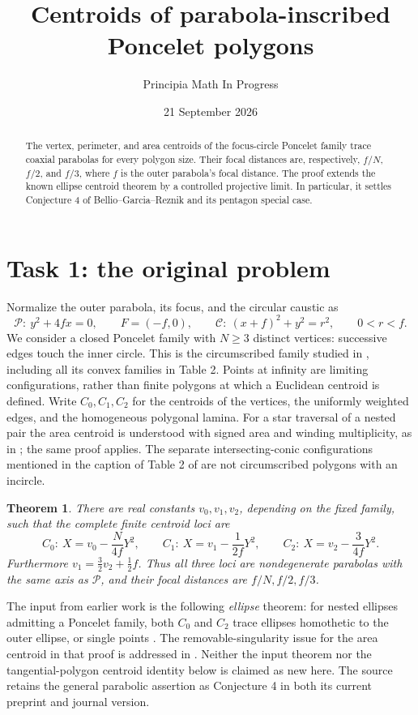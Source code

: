 \documentclass[11pt]{article}
\title{Centroids of parabola-inscribed Poncelet polygons}
\author{Principia Math In Progress}
\date{21 September 2026}
\newtheorem{theorem}{Theorem}
\begin{document}
\maketitle
\begin{abstract}
The vertex, perimeter, and area centroids of the focus-circle Poncelet
family trace coaxial parabolas for every polygon size. Their focal
distances are, respectively, $f/N$, $f/2$, and $f/3$, where $f$ is the
outer parabola's focal distance. The proof extends the known ellipse
centroid theorem by a controlled projective limit. In particular, it
settles Conjecture 4 of Bellio--Garcia--Reznik and its pentagon special case.
\end{abstract}

\section*{Task 1: the original problem}
Normalize the outer parabola, its focus, and the circular caustic as
\[
 \mathcal P:\ y^2+4fx=0,\qquad F=(-f,0),\qquad
 \mathcal C:\ (x+f)^2+y^2=r^2,
 \qquad 0<r<f.
\]
We consider a closed Poncelet family with $N\geq3$ distinct vertices:
successive edges touch the inner circle. This is the circumscribed
family studied in \cite{BGR}, including all its convex families in
Table 2. Points at infinity are limiting configurations, rather than
finite polygons at which a Euclidean centroid is defined.
Write $C_0,C_1,C_2$ for the centroids of the vertices, the uniformly
weighted edges, and the homogeneous polygonal lamina.
For a star traversal of a nested pair the area centroid is understood
with signed area and winding multiplicity, as in \cite{ST}; the same
proof applies. The separate intersecting-conic configurations mentioned
in the caption of Table 2 of \cite{BGR} are not circumscribed polygons
with an incircle.

\begin{theorem}\label{main}
There are real constants $v_0,v_1,v_2$, depending on the fixed family,
such that the complete finite centroid loci are
\[
 C_0:\ X=v_0-\frac{N}{4f}Y^2,\qquad
 C_1:\ X=v_1-\frac{1}{2f}Y^2,\qquad
 C_2:\ X=v_2-\frac{3}{4f}Y^2.
\]
Furthermore $v_1=\tfrac32v_2+\tfrac12f$.
Thus all three loci are nondegenerate parabolas with the same axis as
$\mathcal P$, and their focal distances are $f/N,f/2,f/3$.
\end{theorem}

The input from earlier work is the following \emph{ellipse} theorem:
for nested ellipses admitting a Poncelet family, both $C_0$ and $C_2$
trace ellipses homothetic to the outer ellipse, or single points
\cite[Theorem 1]{ST}. The removable-singularity issue for the area
centroid in that proof is addressed in \cite[Proposition 2]{CC}.
Neither the input theorem nor the tangential-polygon centroid identity
below is claimed as new here. The source retains the general parabolic
assertion as Conjecture 4 in both its current preprint and journal version.
\end{document}
